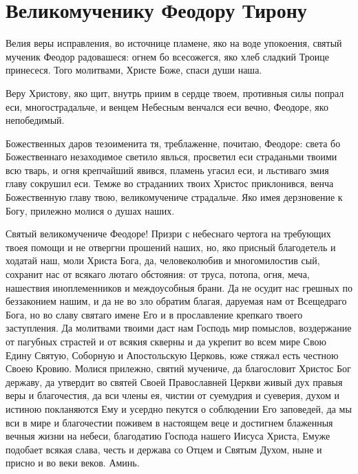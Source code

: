 \section{Великомученику Феодору Тирону}\begin{mymulticols}


Велия веры исправления, во источнице пламене, яко на воде упокоения, святый мученик Феодор радовашеся: огнем бо всесожегся, яко хлеб сладкий Троице принесеся. Того молитвами, Христе Боже, спаси души наша.


Веру Христову, яко щит, внутрь приим в сердце твоем, противныя силы попрал еси, многострадальче, и венцем Небесным венчался еси вечно, Феодоре, яко непобедимый.


Божественных даров тезоименита тя, треблаженне, почитаю, Феодоре: света бо Божественнаго незаходимое светило явлься, просветил еси страданьми твоими всю тварь, и огня крепчайший явився, пламень угасил еси, и льстиваго змия главу сокрушил еси. Темже во страданиих твоих Христос приклонився, венча Божественную главу твою, великомучениче страдальче. Яко имея дерзновение к Богу, прилежно молися о душах наших.


Святый великомучениче Феодоре! Призри с небеснаго чертога на требующих твоея помощи и не отвергни прошений наших, но, яко присный благодетель и ходатай наш, моли Христа Бога, да, человеколюбив и многомилостив сый, сохранит нас от всякаго лютаго обстояния: от труса, потопа, огня, меча, нашествия иноплеменников и междоусобныя брани. Да не осудит нас грешных по беззаконием нашим, и да не во зло обратим благая, даруемая нам от Всещедраго Бога, но во славу святаго имене Его и в прославление крепкаго твоего заступления. Да молитвами твоими даст нам Господь мир помыслов, воздержание от пагубных страстей и от всякия скверны и да укрепит во всем мире Свою Едину Святую, Соборную и Апостольскую Церковь, юже стяжал есть честною Своею Кровию. Молися прилежно, святий мучениче, да благословит Христос Бог державу, да утвердит во святей Своей Православней Церкви живый дух правыя веры и благочестия, да вси члены ея, чистии от суемудрия и суеверия, духом и истиною покланяются Ему и усердно пекутся о соблюдении Его заповедей, да мы вси в мире и благочестии поживем в настоящем веце и достигнем блаженныя вечныя жизни на небеси, благодатию Господа нашего Иисуса Христа, Емуже подобает всякая слава, честь и держава со Отцем и Святым Духом, ныне и присно и во веки веков. Аминь.

\end{mymulticols}

